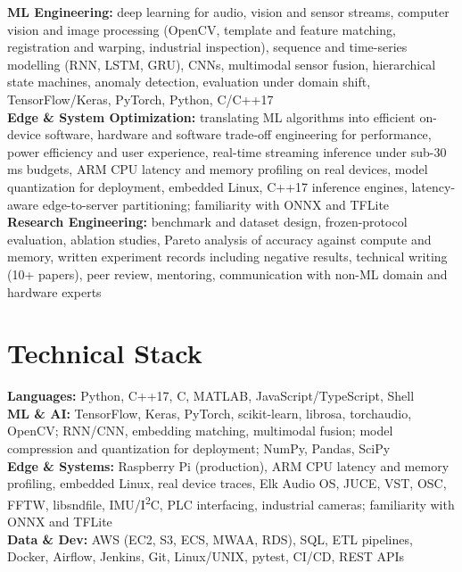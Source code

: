 \documentclass[11pt]{article}
\begin{document}
\textbf{ML Engineering:} deep learning for audio, vision and sensor streams, computer vision and image processing (OpenCV, template and feature matching, registration and warping, industrial inspection), sequence and time-series modelling (RNN, LSTM, GRU), CNNs, multimodal sensor fusion, hierarchical state machines, anomaly detection, evaluation under domain shift, TensorFlow/Keras, PyTorch, Python, C/C++17\\
\textbf{Edge \& System Optimization:} translating ML algorithms into efficient on-device software, hardware and software trade-off engineering for performance, power efficiency and user experience, real-time streaming inference under sub-30 ms budgets, ARM CPU latency and memory profiling on real devices, model quantization for deployment, embedded Linux, C++17 inference engines, latency-aware edge-to-server partitioning; familiarity with ONNX and TFLite\\
\textbf{Research Engineering:} benchmark and dataset design, frozen-protocol evaluation, ablation studies, Pareto analysis of accuracy against compute and memory, written experiment records including negative results, technical writing (10+ papers), peer review, mentoring, communication with non-ML domain and hardware experts

\section*{Technical Stack}

\textbf{Languages:} Python, C++17, C, MATLAB, JavaScript/TypeScript, Shell\\
\textbf{ML \& AI:} TensorFlow, Keras, PyTorch, scikit-learn, librosa, torchaudio, OpenCV; RNN/CNN, embedding matching, multimodal fusion; model compression and quantization for deployment; NumPy, Pandas, SciPy\\
\textbf{Edge \& Systems:} Raspberry Pi (production), ARM CPU latency and memory profiling, embedded Linux, real device traces, Elk Audio OS, JUCE, VST, OSC, FFTW, libsndfile, IMU/I\textsuperscript{2}C, PLC interfacing, industrial cameras; familiarity with ONNX and TFLite\\
\textbf{Data \& Dev:} AWS (EC2, S3, ECS, MWAA, RDS), SQL, ETL pipelines, Docker, Airflow, Jenkins, Git, Linux/UNIX, pytest, CI/CD, REST APIs

\end{document}
